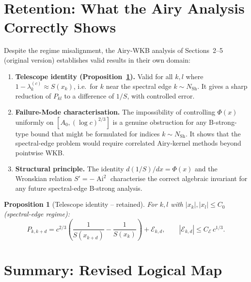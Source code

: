 \documentclass[12pt,a4paper]{article}
\newtheorem{proposition}[theorem]{Proposition}
\newcommand{\Ai}{\operatorname{Ai}}
\newcommand{\lam}[1]{\lambda_{#1}^{(c)}}
\begin{document}
\section{Retention: What the Airy Analysis Correctly Shows}
\label{sec:retention}

Despite the regime misalignment, the Airy-WKB analysis of
Sections~2--5 (original version) establishes valid results
in their own domain:

\begin{enumerate}
  \item \textbf{Telescope identity (Proposition~\ref{prop:telescope_retained}).}
        Valid for all $k, l$ where $1 - \lam{k} \approx S(x_k)$,
        i.e.\ for $k$ near the spectral edge $k \sim N_{\mathrm{Sh}}$.
        It gives a sharp reduction of $P_{kl}$ to a
        difference of $1/S$, with controlled error.

  \item \textbf{Failure-Mode characterisation.}
        The impossibility of controlling $\Phi(x)$ uniformly
        on $[A_0, (\log c)^{2/3}]$ is a genuine obstruction
        for any B-strong-type bound that might be formulated
        for indices $k \sim N_{\mathrm{Sh}}$.
        It shows that the spectral-edge problem would require
        correlated Airy-kernel methods beyond pointwise WKB.

  \item \textbf{Structural principle.}
        The identity $d(1/S)/dx = \Phi(x)$ and the
        Wronskian relation $S' = -\Ai^2$ characterise the
        correct algebraic invariant for any future
        spectral-edge B-strong analysis.
\end{enumerate}

\begin{proposition}[Telescope identity -- retained]
\label{prop:telescope_retained}
For $k, l$ with $|x_k|, |x_l| \leq C_0$ (spectral-edge regime):
\[
  P_{k,k+d}
  = c^{2/3}\!\left(\frac{1}{S(x_{k+d})} - \frac{1}{S(x_k)}\right)
  + \mathcal{E}_{k,d},
  \qquad |\mathcal{E}_{k,d}| \leq C_{\mathcal{E}}\, c^{1/3}.
\]
\end{proposition}

\section{Summary: Revised Logical Map}
\end{document}
